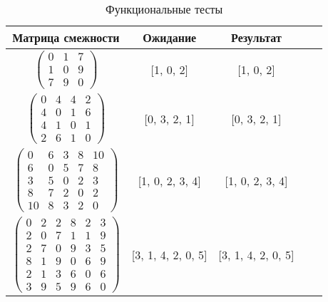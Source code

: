 \begin{center}
    \captionsetup{justification=raggedright,singlelinecheck=off}
    \begin{longtable}[c]{|c|c|c|c|c|}
    \caption{Функциональные тесты\label{tbl:functional_test}} \\ \hline
		Матрица смежности & Ожидание & Результат \\ \hline
		$\begin{pmatrix}0 & 1 & 7 \\
						1 & 0 & 9 \\
						7 & 9 & 0 \end{pmatrix}$ & [1, 0, 2] & [1, 0, 2] \\ \hline
		$\begin{pmatrix}0 & 4 & 4 & 2 \\
						4 & 0 & 1 & 6 \\
						4 & 1 & 0 & 1 \\
						2 & 6 & 1 & 0 \end{pmatrix}$ & [0, 3, 2, 1] & [0, 3, 2, 1] \\ \hline
		$\begin{pmatrix}0 & 6 & 3 & 8 & 10 \\
						6 & 0 & 5 & 7 & 8 \\
						3 & 5 & 0 & 2 & 3 \\
						8 & 7 & 2 & 0 & 2 \\
						10 & 8 & 3 & 2 & 0 \end{pmatrix}$ & [1, 0, 2, 3, 4] & [1, 0, 2, 3, 4] \\ \hline
		$\begin{pmatrix}0 & 2 & 2 & 8 & 2 & 3 \\
						2 & 0 & 7 & 1 & 1 & 9 \\
						2 & 7 & 0 & 9 & 3 & 5 \\
						8 & 1 & 9 & 0 & 6 & 9 \\
						2 & 1 & 3 & 6 & 0 & 6 \\
						3 & 9 & 5 & 9 & 6 & 0 \end{pmatrix}$ & [3, 1, 4, 2, 0, 5] & [3, 1, 4, 2, 0, 5] \\
		\hline
	\end{longtable}
\end{center}
